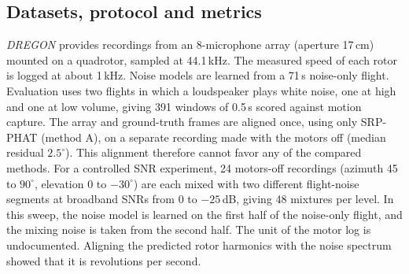 \documentclass{svproc}
\begin{document}
\subsection{Datasets, protocol and metrics}
\emph{DREGON} \cite{strauss2018dregon} provides recordings from an 8-microphone array (aperture 17\,cm) mounted on a quadrotor, sampled at 44.1\,kHz.
The measured speed of each rotor is logged at about 1\,kHz.
Noise models are learned from a 71\,s noise-only flight.
Evaluation uses two flights in which a loudspeaker plays white noise, one at high and one at low volume, giving 391 windows of 0.5\,s scored against motion capture.
The array and ground-truth frames are aligned once, using only SRP-PHAT (method A), on a separate recording made with the motors off (median residual $2.5^\circ$).
This alignment therefore cannot favor any of the compared methods.
For a controlled SNR experiment, 24 motors-off recordings (azimuth 45 to $90^\circ$, elevation 0 to $-30^\circ$) are each mixed with two different flight-noise segments at broadband SNRs from 0 to $-25$\,dB, giving 48 mixtures per level.
In this sweep, the noise model is learned on the first half of the noise-only flight, and the mixing noise is taken from the second half.
The unit of the motor log is undocumented.
Aligning the predicted rotor harmonics with the noise spectrum showed that it is revolutions per second.
\end{document}
